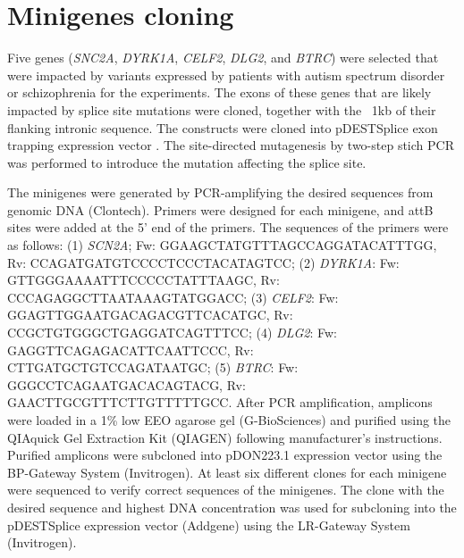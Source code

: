 \documentclass[12pt,chapterheads,final]{ucsd}
\begin{document}
\section{Minigenes cloning}
Five genes (\textit{SNC2A}, \textit{DYRK1A}, \textit{CELF2}, \textit{DLG2}, and \textit{BTRC}) were selected that were impacted by variants expressed by patients with autism spectrum disorder or schizophrenia for the experiments. The exons of these genes that are likely impacted by splice site mutations were cloned, together with the ~1kb of their flanking intronic sequence. The constructs were cloned into pDESTSplice exon trapping expression vector \cite{Kishore2008}. The site-directed mutagenesis by two-step stich PCR was performed to introduce the mutation affecting the splice site. \par
The minigenes were generated by PCR-amplifying the desired sequences from genomic DNA (Clontech). Primers were designed for each minigene, and attB sites were added at the 5’ end of the primers. The sequences of the primers were as follows: (1) \textit{SCN2A}; Fw: GGAAGCTATGTTTAGCCAGGATACATTTGG, Rv: CCAGATGATGTCCCCTCCCTACATAGTCC; (2) \textit{DYRK1A}: Fw: GTTGGGAAAATTTCCCCCTATTTAAGC, Rv: CCCAGAGGCTTAATAAAGTATGGACC; (3) \textit{CELF2}: Fw: GGAGTTGGAATGACAGACGTTCACATGC, Rv: CCGCTGTGGGCTGAGGATCAGTTTCC; (4) \textit{DLG2}: Fw: GAGGTTCAGAGACATTCAATTCCC, Rv: CTTGATGCTGTCCAGATAATGC; (5) \textit{BTRC}: Fw: GGGCCTCAGAATGACACAGTACG, Rv: GAACTTGCGTTTCTTGTTTTTGCC. After PCR amplification, amplicons were loaded in a 1\% low EEO agarose gel (G-BioSciences) and purified using the QIAquick Gel Extraction Kit (QIAGEN) following manufacturer’s instructions. Purified amplicons were subcloned into pDON223.1 expression vector using the BP-Gateway System (Invitrogen). At least six different clones for each minigene were sequenced to verify correct sequences of the minigenes. The clone with the desired sequence and highest DNA concentration was used for subcloning into the pDESTSplice expression vector (Addgene) using the LR-Gateway System (Invitrogen).
\end{document}
